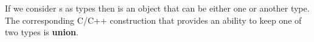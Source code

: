 \begin{example}[Sum][\textbf{C++}]
  \label{ex:cpp_sum}
  If we consider s as types then
   is an object that can be either one or another
  type. The corresponding C/C++ construction that provides an ability
  to keep one of two types is \textbf{union}. 

    
          


\end{example}
